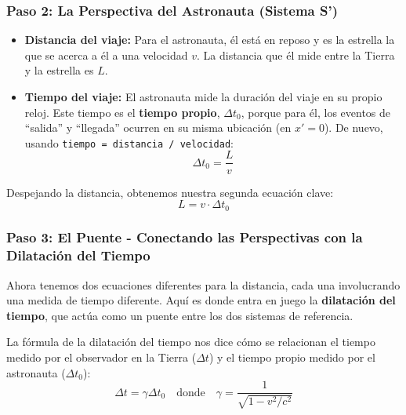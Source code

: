 \documentclass[11pt,a4paper]{book}
\begin{document}
\subsubsection*{Paso 2: La Perspectiva del Astronauta (Sistema S')}
\begin{itemize}
    \item \textbf{Distancia del viaje:} Para el astronauta, él está en reposo y es la estrella la que se acerca a él a una velocidad $v$. La distancia que él mide entre la Tierra y la estrella es $L$.
    \item \textbf{Tiempo del viaje:} El astronauta mide la duración del viaje en su propio reloj. Este tiempo es el \textbf{tiempo propio}, $\Delta t_0$, porque para él, los eventos de ``salida'' y ``llegada'' ocurren en su misma ubicación (en $x'=0$). De nuevo, usando \texttt{tiempo = distancia / velocidad}:
    \[ \Delta t_0 = \frac{L}{v} \]
\end{itemize}
Despejando la distancia, obtenemos nuestra segunda ecuación clave:
\begin{equation} \label{eq:dist_nave}
    L = v \cdot \Delta t_0
\end{equation}

\subsubsection*{Paso 3: El Puente - Conectando las Perspectivas con la Dilatación del Tiempo}
Ahora tenemos dos ecuaciones diferentes para la distancia, cada una involucrando una medida de tiempo diferente. Aquí es donde entra en juego la \textbf{dilatación del tiempo}, que actúa como un puente entre los dos sistemas de referencia.

La fórmula de la dilatación del tiempo nos dice cómo se relacionan el tiempo medido por el observador en la Tierra ($\Delta t$) y el tiempo propio medido por el astronauta ($\Delta t_0$):
\begin{equation} \label{eq:dilatacion}
    \Delta t = \gamma \Delta t_0 \quad \text{donde} \quad \gamma = \frac{1}{\sqrt{1 - v^2/c^2}}
\end{equation}
\end{document}
